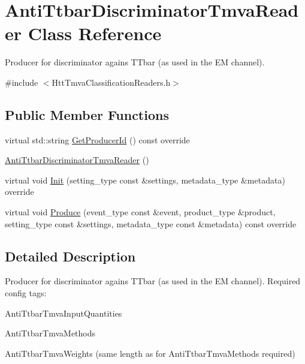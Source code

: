 \hypertarget{classAntiTtbarDiscriminatorTmvaReader}{
\section{AntiTtbarDiscriminatorTmvaReader Class Reference}
\label{classAntiTtbarDiscriminatorTmvaReader}
}


Producer for discriminator agains TTbar (as used in the EM channel).  


{\ttfamily \#include $<$HttTmvaClassificationReaders.h$>$}\subsection*{Public Member Functions}
\begin{DoxyCompactItemize}
\item 
virtual std::string \hyperlink{classAntiTtbarDiscriminatorTmvaReader_adfd8a81ccfe692021fa40adeb0d9eed9}{GetProducerId} () const override
\item 
\hyperlink{classAntiTtbarDiscriminatorTmvaReader_a904c009bb180d246e5d0fd4814d014fa}{AntiTtbarDiscriminatorTmvaReader} ()
\item 
virtual void \hyperlink{classAntiTtbarDiscriminatorTmvaReader_ac535a532e2737e6991fd6d36d49cb12f}{Init} (setting\_\-type const \&settings, metadata\_\-type \&metadata) override
\item 
virtual void \hyperlink{classAntiTtbarDiscriminatorTmvaReader_aceac156af9c7dd33d0c4f3827ad7a27d}{Produce} (event\_\-type const \&event, product\_\-type \&product, setting\_\-type const \&settings, metadata\_\-type const \&metadata) const override
\end{DoxyCompactItemize}


\subsection{Detailed Description}
Producer for discriminator agains TTbar (as used in the EM channel). Required config tags:
\begin{DoxyItemize}
\item AntiTtbarTmvaInputQuantities
\item AntiTtbarTmvaMethods
\item AntiTtbarTmvaWeights (same length as for AntiTtbarTmvaMethods required) 
\end{DoxyItemize}


